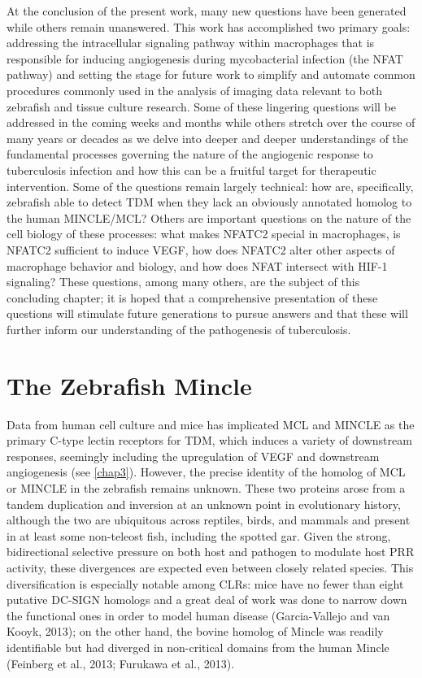 At the conclusion of the present work, many new questions have been generated while others remain unanswered. This work has accomplished two primary goals: addressing the intracellular signaling pathway within macrophages that is responsible for inducing angiogenesis during mycobacterial infection (the NFAT pathway) and setting the stage for future work to simplify and automate common procedures commonly used in the analysis of imaging data relevant to both zebrafish and tissue culture research. Some of these lingering questions will be addressed in the coming weeks and months while others stretch over the course of many years or decades as we delve into deeper and deeper understandings of the fundamental processes governing the nature of the angiogenic response to tuberculosis infection and how this can be a fruitful target for therapeutic intervention. Some of the questions remain largely technical: how are, specifically, zebrafish able to detect TDM when they lack an obviously annotated homolog to the human MINCLE/MCL? Others are important questions on the nature of the cell biology of these processes: what makes NFATC2 special in macrophages, is NFATC2 sufficient to induce VEGF, how does NFATC2 alter other aspects of macrophage behavior and biology, and how does NFAT intersect with HIF-1\textalpha{} signaling? These questions, among many others, are the subject of this concluding chapter; it is hoped that a comprehensive presentation of these questions will stimulate future generations to pursue answers and that these will further inform our understanding of the pathogenesis of tuberculosis.

\section{The Zebrafish Mincle}

Data from human cell culture and mice has implicated MCL and MINCLE as the primary C-type lectin receptors for TDM, which induces a variety of downstream responses, seemingly including the upregulation of VEGF and downstream angiogenesis (see \autoref{chap3}). However, the precise identity of the homolog of MCL or MINCLE in the zebrafish remains unknown. These two proteins arose from a tandem duplication and inversion at an unknown point in evolutionary history, although the two are ubiquitous across reptiles, birds, and mammals and present in at least some non-teleost fish, including the spotted gar. Given the strong, bidirectional selective pressure on both host and pathogen to modulate host PRR activity, these divergences are expected even between closely related species. This diversification is especially notable among CLRs: mice have no fewer than eight putative DC-SIGN homologs and a great deal of work was done to narrow down the functional ones in order to model human disease (Garcia-Vallejo and van Kooyk, 2013); on the other hand, the bovine homolog of Mincle was readily identifiable but had diverged in non-critical domains from the human Mincle (Feinberg et al., 2013; Furukawa et al., 2013).

